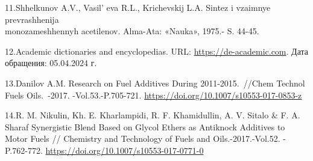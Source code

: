 \begin{references}
11.Shhelkunov A.V., Vasil' eva R.L., Krichevskij L.A.
Sintez i vzaimnye prevrashhenija \\monozameshhennyh acetilenov. Alma-Ata:
«Nauka», 1975.- S. 44-45.

12.Academic dictionaries and encyclopedias. URL:
\href{https://de-academic.com/dic.nsf/dewiki/411193}{https://de-academic.com}. Дата обращения:
05.04.2024 г.

13.Danilov A.M. Research on Fuel Additives During 2011-2015.~//Chem
Technol Fuels Oils.~-2017. -Vol.53.-P.705-721.
\url{https://doi.org/10.1007/s10553-017-0853-z}

14.R. M. Nikulin, Kh. E. Kharlampidi, R. F. Khamidullin, A. V. Sitalo \&
F. A. Sharaf Synergistic Blend Based on Glycol Ethers as Antiknock
Additives to Motor Fuels // Chemistry and Technology of Fuels and
Oils.-2017.-Vol.52. - P.762-772.
\url{https://doi.org/10.1007/s10553-017-0771-0}
\end{references}

